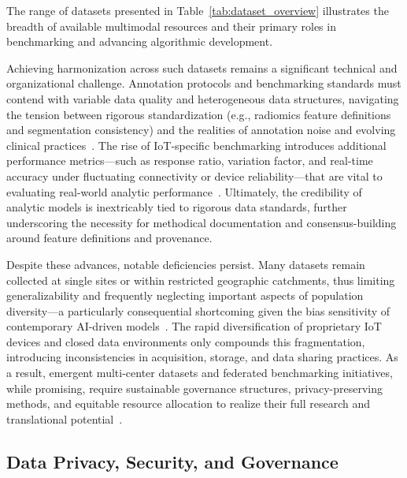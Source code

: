 \documentclass[11pt]{article}
\begin{document}
The range of datasets presented in Table~\ref{tab:dataset_overview} illustrates the breadth of available multimodal resources and their primary roles in benchmarking and advancing algorithmic development.

Achieving harmonization across such datasets remains a significant technical and organizational challenge. Annotation protocols and benchmarking standards must contend with variable data quality and heterogeneous data structures, navigating the tension between rigorous standardization (e.g., radiomics feature definitions and segmentation consistency) and the realities of annotation noise and evolving clinical practices~\cite{ref44, ref45, ref46, ref50, ref54, ref55, ref60, ref61, ref62, ref63, ref64, ref65, ref66, ref67, ref82, ref83, ref84, ref89, ref90, ref106}. The rise of IoT-specific benchmarking introduces additional performance metrics—such as response ratio, variation factor, and real-time accuracy under fluctuating connectivity or device reliability—that are vital to evaluating real-world analytic performance~\cite{ref84, ref106}. Ultimately, the credibility of analytic models is inextricably tied to rigorous data standards, further underscoring the necessity for methodical documentation and consensus-building around feature definitions and provenance.

Despite these advances, notable deficiencies persist. Many datasets remain collected at single sites or within restricted geographic catchments, thus limiting generalizability and frequently neglecting important aspects of population diversity—a particularly consequential shortcoming given the bias sensitivity of contemporary AI-driven models~\cite{ref43, ref75, ref106}. The rapid diversification of proprietary IoT devices and closed data environments only compounds this fragmentation, introducing inconsistencies in acquisition, storage, and data sharing practices. As a result, emergent multi-center datasets and federated benchmarking initiatives, while promising, require sustainable governance structures, privacy-preserving methods, and equitable resource allocation to realize their full research and translational potential~\cite{ref84, ref106}.

\subsection{Data Privacy, Security, and Governance}
\end{document}
